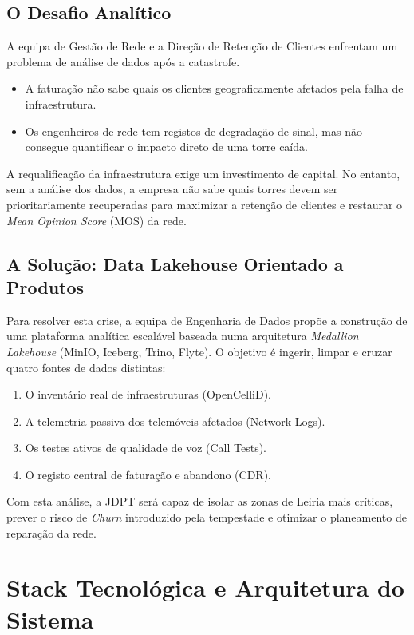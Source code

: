 \documentclass[runningheads]{llncs}
\begin{document}
\subsection{O Desafio Analítico}
A equipa de Gestão de Rede e a Direção de Retenção de Clientes enfrentam um problema de análise de dados após a catastrofe.
\begin{itemize}
    \item A faturação não sabe quais os clientes geograficamente afetados pela falha de infraestrutura.
    \item Os engenheiros de rede tem registos de degradação de sinal, mas não consegue quantificar o impacto direto de uma torre caída.
\end{itemize}

A requalificação da infraestrutura exige um investimento de capital. No entanto, sem a análise dos dados, a empresa não sabe quais torres devem ser prioritariamente recuperadas para maximizar a retenção de clientes e restaurar o \textit{Mean Opinion Score} (MOS) da rede.


\subsection{A Solução: Data Lakehouse Orientado a Produtos}
Para resolver esta crise, a equipa de Engenharia de Dados propõe a construção de uma plataforma analítica escalável baseada numa arquitetura \textit{Medallion Lakehouse} (MinIO, Iceberg, Trino, Flyte). O objetivo é ingerir, limpar e cruzar quatro fontes de dados distintas:
\begin{enumerate}
    \item O inventário real de infraestruturas (OpenCelliD).
    \item A telemetria passiva dos telemóveis afetados (Network Logs).
    \item Os testes ativos de qualidade de voz (Call Tests).
    \item O registo central de faturação e abandono (CDR).
\end{enumerate}

Com esta análise, a JDPT será capaz de isolar as zonas de Leiria mais críticas, prever o risco de \textit{Churn} introduzido pela tempestade e otimizar o planeamento de reparação da rede.

\section{Stack Tecnológica e Arquitetura do Sistema}
\end{document}
